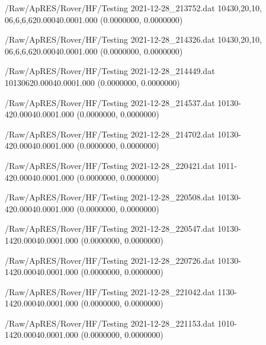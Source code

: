 \hfaprestable
{/Raw/ApRES/Rover/HF/Testing}%
{2021-12-28\_213752.dat}%
{10}{4}{30,20,10, 0}{6,6,6,6}{20.000}{40.000}{1.000}%
{ (0.0000000, 0.0000000)}%
{}%
{}%

\hfaprestable
{/Raw/ApRES/Rover/HF/Testing}%
{2021-12-28\_214326.dat}%
{10}{4}{30,20,10, 0}{6,6,6,6}{20.000}{40.000}{1.000}%
{ (0.0000000, 0.0000000)}%
{}%
{}%

\hfaprestable
{/Raw/ApRES/Rover/HF/Testing}%
{2021-12-28\_214449.dat}%
{10}{1}{30}{6}{20.000}{40.000}{1.000}%
{ (0.0000000, 0.0000000)}%
{}%
{}%

\hfaprestable
{/Raw/ApRES/Rover/HF/Testing}%
{2021-12-28\_214537.dat}%
{10}{1}{30}{-4}{20.000}{40.000}{1.000}%
{ (0.0000000, 0.0000000)}%
{}%
{}%

\hfaprestable
{/Raw/ApRES/Rover/HF/Testing}%
{2021-12-28\_214702.dat}%
{10}{1}{30}{-4}{20.000}{40.000}{1.000}%
{ (0.0000000, 0.0000000)}%
{}%
{}%

\hfaprestable
{/Raw/ApRES/Rover/HF/Testing}%
{2021-12-28\_220421.dat}%
{10}{1}{1}{-4}{20.000}{40.000}{1.000}%
{ (0.0000000, 0.0000000)}%
{}%
{}%

\hfaprestable
{/Raw/ApRES/Rover/HF/Testing}%
{2021-12-28\_220508.dat}%
{10}{1}{30}{-4}{20.000}{40.000}{1.000}%
{ (0.0000000, 0.0000000)}%
{}%
{}%

\hfaprestable
{/Raw/ApRES/Rover/HF/Testing}%
{2021-12-28\_220547.dat}%
{10}{1}{30}{-14}{20.000}{40.000}{1.000}%
{ (0.0000000, 0.0000000)}%
{}%
{}%

\hfaprestable
{/Raw/ApRES/Rover/HF/Testing}%
{2021-12-28\_220726.dat}%
{10}{1}{30}{-14}{20.000}{40.000}{1.000}%
{ (0.0000000, 0.0000000)}%
{}%
{}%

\hfaprestable
{/Raw/ApRES/Rover/HF/Testing}%
{2021-12-28\_221042.dat}%
{1}{1}{30}{-14}{20.000}{40.000}{1.000}%
{ (0.0000000, 0.0000000)}%
{}%
{}%

\hfaprestable
{/Raw/ApRES/Rover/HF/Testing}%
{2021-12-28\_221153.dat}%
{10}{1}{0}{-14}{20.000}{40.000}{1.000}%
{ (0.0000000, 0.0000000)}%
{}%
{}%

